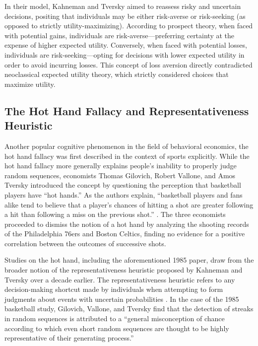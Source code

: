 \documentclass[12pt]{article}
\numberwithin{equation}{section}
\begin{document}
\vspace{5mm} %

In their model, Kahneman and Tversky aimed to reassess risky and uncertain decisions, positing that individuals may be either risk-averse or risk-seeking (as opposed to strictly utility-maximizing). According to prospect theory, when faced with potential gains, individuals are risk-averse---preferring certainty at the expense of higher expected utility. Conversely, when faced with potential losses, individuals are risk-seeking---opting for decisions with lower expected utility in order to avoid incurring losses. This concept of loss aversion directly contradicted neoclassical expected utility theory, which strictly considered choices that maximize utility.

\subsection{The Hot Hand Fallacy and Representativeness Heuristic}

Another popular cognitive phenomenon in the field of behavioral economics, the hot hand fallacy was first described in the context of sports explicitly. While the hot hand fallacy more generally explains people’s inability to properly judge random sequences, economists Thomas Gilovich, Robert Vallone, and Amos Tversky introduced the concept by questioning the perception that basketball players have “hot hands.” As the authors explain, “basketball players and fans alike tend to believe that a player’s chances of hitting a shot are greater following a hit than following a miss on the previous shot.” \parencite{gilovich_hot_1985}. The three economists proceeded to dismiss the notion of a hot hand by analyzing the shooting records of the Philadelphia 76ers and Boston Celtics, finding no evidence for a positive correlation between the outcomes of successive shots.

\vspace{5mm} %

Studies on the hot hand, including the aforementioned 1985 paper, draw from the broader notion of the representativeness heuristic proposed by Kahneman and Tversky over a decade earlier. The representativeness heuristic refers to any decision-making shortcut made by individuals when attempting to form judgments about events with uncertain probabilities \parencite{tversky_judgment_1974}. In the case of the 1985 basketball study, Gilovich, Vallone, and Tversky find that the detection of streaks in random sequences is attributed to a “general misconception of chance according to which even short random sequences are thought to be highly representative of their generating process.”
\end{document}
